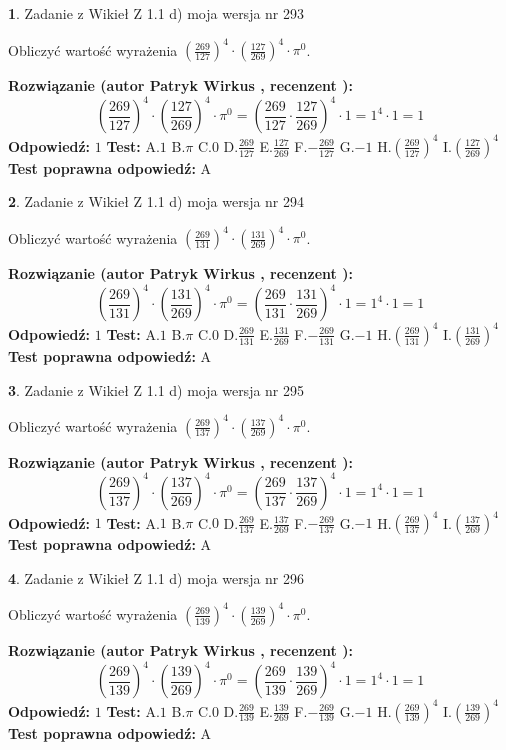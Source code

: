 \documentclass[12pt, a4paper]{article}
\theoremstyle{definition} %
\newtheorem{zad}{}
\newcommand{\zadStart}[1]{\begin{zad}#1\newline}
\newcommand{\zadStop}{\end{zad}}
\newcommand{\rozwStart}[2]{\noindent \textbf{Rozwiązanie (autor #1 , recenzent #2): }\newline}
\newcommand{\rozwStop}{\newline}
\newcommand{\odpStart}{\noindent \textbf{Odpowiedź:}\newline}
\newcommand{\odpStop}{\newline}
\newcommand{\testStart}{\noindent \textbf{Test:}\newline}
\newcommand{\testStop}{\newline}
\newcommand{\kluczStart}{\noindent \textbf{Test poprawna odpowiedź:}\newline}
\newcommand{\kluczStop}{\newline}
\begin{document}
\zadStart{Zadanie z Wikieł Z 1.1 d) moja wersja nr 293}

Obliczyć wartość wyrażenia $(\frac{269}{127})^{4} \cdot (\frac{127}{269})^{4} \cdot \pi^{0}$.
\zadStop
\rozwStart{Patryk Wirkus}{}
$$(\frac{269}{127})^{4} \cdot (\frac{127}{269})^{4} \cdot \pi^{0} = (\frac{269}{127} \cdot \frac{127}{269})^{4} \cdot 1 = 1^{4} \cdot 1 = 1$$
\rozwStop
\odpStart
$1$
\odpStop
\testStart
A.$1$ B.$\pi$ C.$0$ D.$\frac{269}{127}$ E.$\frac{127}{269}$
F.$-\frac{269}{127}$ G.$-1$
H.$(\frac{269}{127})^{4}$
I.$(\frac{127}{269})^{4}$
\testStop
\kluczStart
A
\kluczStop



\zadStart{Zadanie z Wikieł Z 1.1 d) moja wersja nr 294}

Obliczyć wartość wyrażenia $(\frac{269}{131})^{4} \cdot (\frac{131}{269})^{4} \cdot \pi^{0}$.
\zadStop
\rozwStart{Patryk Wirkus}{}
$$(\frac{269}{131})^{4} \cdot (\frac{131}{269})^{4} \cdot \pi^{0} = (\frac{269}{131} \cdot \frac{131}{269})^{4} \cdot 1 = 1^{4} \cdot 1 = 1$$
\rozwStop
\odpStart
$1$
\odpStop
\testStart
A.$1$ B.$\pi$ C.$0$ D.$\frac{269}{131}$ E.$\frac{131}{269}$
F.$-\frac{269}{131}$ G.$-1$
H.$(\frac{269}{131})^{4}$
I.$(\frac{131}{269})^{4}$
\testStop
\kluczStart
A
\kluczStop



\zadStart{Zadanie z Wikieł Z 1.1 d) moja wersja nr 295}

Obliczyć wartość wyrażenia $(\frac{269}{137})^{4} \cdot (\frac{137}{269})^{4} \cdot \pi^{0}$.
\zadStop
\rozwStart{Patryk Wirkus}{}
$$(\frac{269}{137})^{4} \cdot (\frac{137}{269})^{4} \cdot \pi^{0} = (\frac{269}{137} \cdot \frac{137}{269})^{4} \cdot 1 = 1^{4} \cdot 1 = 1$$
\rozwStop
\odpStart
$1$
\odpStop
\testStart
A.$1$ B.$\pi$ C.$0$ D.$\frac{269}{137}$ E.$\frac{137}{269}$
F.$-\frac{269}{137}$ G.$-1$
H.$(\frac{269}{137})^{4}$
I.$(\frac{137}{269})^{4}$
\testStop
\kluczStart
A
\kluczStop



\zadStart{Zadanie z Wikieł Z 1.1 d) moja wersja nr 296}

Obliczyć wartość wyrażenia $(\frac{269}{139})^{4} \cdot (\frac{139}{269})^{4} \cdot \pi^{0}$.
\zadStop
\rozwStart{Patryk Wirkus}{}
$$(\frac{269}{139})^{4} \cdot (\frac{139}{269})^{4} \cdot \pi^{0} = (\frac{269}{139} \cdot \frac{139}{269})^{4} \cdot 1 = 1^{4} \cdot 1 = 1$$
\rozwStop
\odpStart
$1$
\odpStop
\testStart
A.$1$ B.$\pi$ C.$0$ D.$\frac{269}{139}$ E.$\frac{139}{269}$
F.$-\frac{269}{139}$ G.$-1$
H.$(\frac{269}{139})^{4}$
I.$(\frac{139}{269})^{4}$
\testStop
\kluczStart
A
\kluczStop
\end{document}
